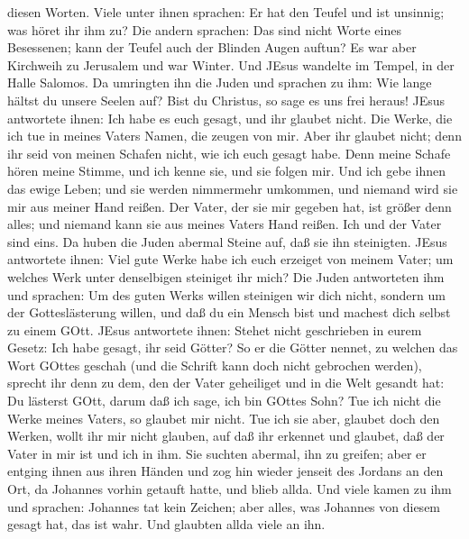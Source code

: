 diesen Worten.  Viele unter ihnen sprachen: Er hat den
Teufel und ist unsinnig; was höret ihr ihm zu?  Die andern
sprachen: Das sind nicht Worte eines Besessenen; kann der Teufel auch
der Blinden Augen auftun?  Es war aber Kirchweih zu
Jerusalem und war Winter.  Und JEsus wandelte im Tempel, in
der Halle Salomos.  Da umringten ihn die Juden und sprachen
zu ihm: Wie lange hältst du unsere Seelen auf? Bist du Christus, so sage
es uns frei heraus!  JEsus antwortete ihnen: Ich habe es
euch gesagt, und ihr glaubet nicht. Die Werke, die ich tue in meines
Vaters Namen, die zeugen von mir.  Aber ihr glaubet nicht;
denn ihr seid von meinen Schafen nicht, wie ich euch gesagt habe.
 Denn meine Schafe hören meine Stimme, und ich kenne sie,
und sie folgen mir.  Und ich gebe ihnen das ewige Leben;
und sie werden nimmermehr umkommen, und niemand wird sie mir aus meiner
Hand reißen.  Der Vater, der sie mir gegeben hat, ist
größer denn alles; und niemand kann sie aus meines Vaters Hand reißen.
 Ich und der Vater sind eins.  Da huben die
Juden abermal Steine auf, daß sie ihn steinigten.  JEsus
antwortete ihnen: Viel gute Werke habe ich euch erzeiget von meinem
Vater; um welches Werk unter denselbigen steiniget ihr mich?
 Die Juden antworteten ihm und sprachen: Um des guten Werks
willen steinigen wir dich nicht, sondern um der Gotteslästerung willen,
und daß du ein Mensch bist und machest dich selbst zu einem GOtt.
 JEsus antwortete ihnen: Stehet nicht geschrieben in eurem
Gesetz: Ich habe gesagt, ihr seid Götter?  So er die Götter
nennet, zu welchen das Wort GOttes geschah (und die Schrift kann doch
nicht gebrochen werden),  sprecht ihr denn zu dem, den der
Vater geheiliget und in die Welt gesandt hat: Du lästerst GOtt, darum
daß ich sage, ich bin GOttes Sohn?  Tue ich nicht die Werke
meines Vaters, so glaubet mir nicht.  Tue ich sie aber,
glaubet doch den Werken, wollt ihr mir nicht glauben, auf daß ihr
erkennet und glaubet, daß der Vater in mir ist und ich in ihm.
 Sie suchten abermal, ihn zu greifen; aber er entging ihnen
aus ihren Händen  und zog hin wieder jenseit des Jordans an
den Ort, da Johannes vorhin getauft hatte, und blieb allda.
 Und viele kamen zu ihm und sprachen: Johannes tat kein
Zeichen; aber alles, was Johannes von diesem gesagt hat, das ist wahr.
 Und glaubten allda viele an ihn.


